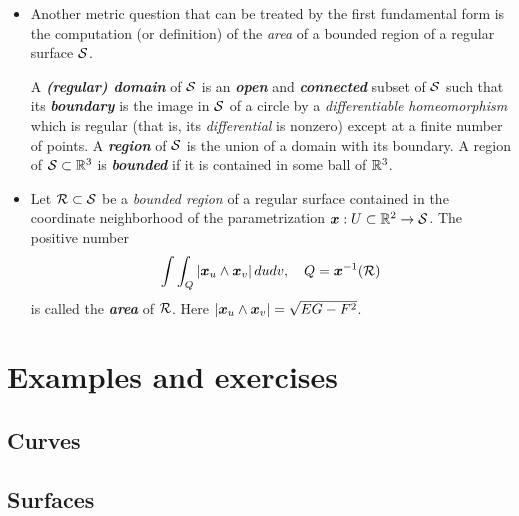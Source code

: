 \documentclass[11pt]{article}
\begin{document}
\begin{itemize}
\item Another metric question that can be treated by the first fundamental form is the computation (or definition) of the \emph{area} of a bounded region of a regular surface ${\mathcal S}$. 

\begin{definition}
A \emph{\textbf{(regular) domain}} of ${\mathcal S}$ is an \emph{\textbf{open}} and \emph{\textbf{connected}} subset of ${\mathcal S}$ such that its \emph{\textbf{\textbf{boundary}}} is the image in ${\mathcal S}$ of a circle by a \emph{differentiable} \emph{homeomorphism} which is regular (that is, its \emph{differential} is nonzero) except at a finite number of points. A \emph{\textbf{region}} of ${\mathcal S}$ is the union of a domain with its boundary. 
A region of ${\mathcal S} \subset {\mathbb R}^3$ is \emph{\textbf{bounded}} if it is contained in some ball of ${\mathbb R}^3$.
\end{definition}

\item \begin{definition}
Let ${\mathcal R} \subset {\mathcal S}$ be a \emph{bounded region} of a regular surface contained in the coordinate neighborhood of the parametrization $\boldsymbol{x}: U \subset {\mathbb R}^2 \rightarrow {\mathcal S}$. The positive number
\begin{align}
\int\int_{Q} \left\lvert \boldsymbol{x}_{u}\wedge \boldsymbol{x}_{v} \right\rvert dudv, \quad Q = \boldsymbol{x}^{-1}({\mathcal R}) \label{eqn: area_first_fund}
\end{align} 
is called the \emph{\textbf{area}} of ${\mathcal R}$. Here $\left\lvert \boldsymbol{x}_{u}\wedge \boldsymbol{x}_{v} \right\rvert = \sqrt{EG - F^{2}}$.
\end{definition}
\end{itemize}




\newpage

\section{Examples and exercises}
\subsection{Curves}

\subsection{Surfaces}

\newpage


\end{document}
